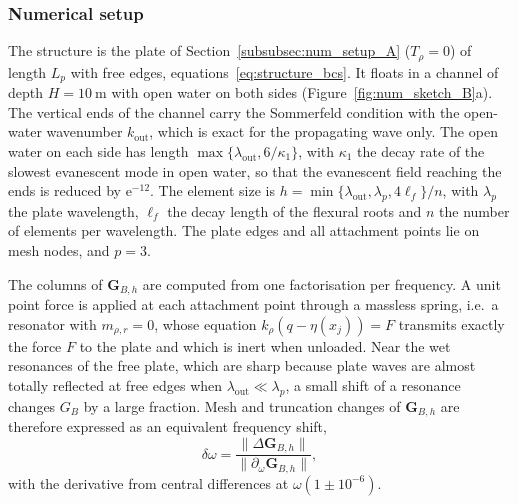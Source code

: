 {\subsubsection{Numerical setup}\label{subsubsec:num_setup_B}

The structure is the plate of Section~\ref{subsubsec:num_setup_A} ($T_\rho=0$) of length $L_p$ with free edges, equations~\eqref{eq:structure_bcs}. It floats in a channel of depth $H=10~\si{\meter}$ with open water on both sides (Figure~\ref{fig:num_sketch_B}a). The vertical ends of the channel carry the Sommerfeld condition with the open-water wavenumber $k_\mathrm{out}$, which is exact for the propagating wave only. The open water on each side has length $\max\{\lambda_\mathrm{out},6/\kappa_1\}$, with $\kappa_1$ the decay rate of the slowest evanescent mode in open water, so that the evanescent field reaching the ends is reduced by $\mathrm{e}^{-12}$. The element size is $h=\min\{\lambda_\mathrm{out},\lambda_p,4\ell_f\}/n$, with $\lambda_p$ the plate wavelength, $\ell_f$ the decay length of the flexural roots and $n$ the number of elements per wavelength. The plate edges and all attachment points lie on mesh nodes, and $p=3$.

The columns of $\mathbf{G}_{B,h}$ are computed from one factorisation per frequency. A unit point force is applied at each attachment point through a massless spring, i.e.\ a resonator with $m_{\rho,r}=0$, whose equation $k_\rho(q-\eta(x_j))=F$ transmits exactly the force $F$ to the plate and which is inert when unloaded. Near the wet resonances of the free plate, which are sharp because plate waves are almost totally reflected at free edges when $\lambda_\mathrm{out}\ll\lambda_p$, a small shift of a resonance changes $G_B$ by a large fraction. Mesh and truncation changes of $\mathbf{G}_{B,h}$ are therefore expressed as an equivalent frequency shift,
\begin{equation}\label{eq:num_freq_equivalent}
    \delta\omega=\frac{\|\Delta\mathbf{G}_{B,h}\|}{\|\partial_\omega\mathbf{G}_{B,h}\|},
\end{equation}
with the derivative from central differences at $\omega(1\pm10^{-6})$.

}

